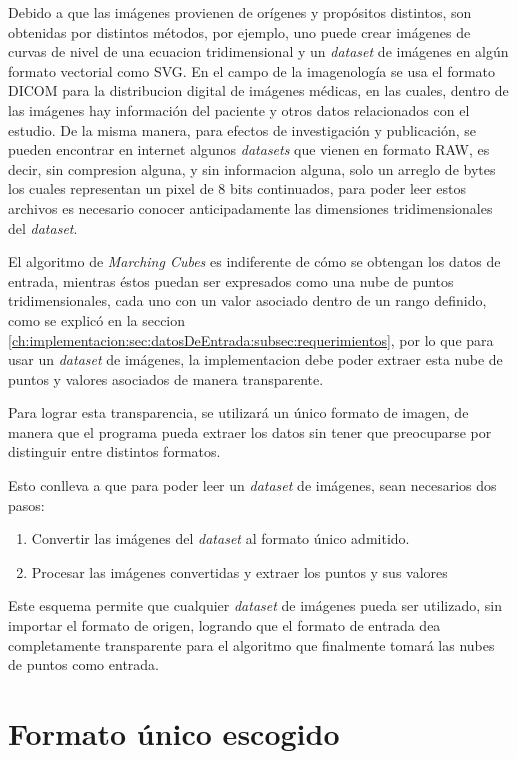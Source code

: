 Debido a que las imágenes provienen de orígenes y propósitos distintos, son obtenidas por distintos métodos, por ejemplo, uno puede crear imágenes de curvas de nivel de una ecuacion tridimensional y un \emph{dataset} de imágenes en algún formato vectorial como SVG. En el campo de la imagenología se usa el formato DICOM para la distribucion digital de imágenes médicas, en las cuales, dentro de las imágenes hay información del paciente y otros datos relacionados con el estudio. De la misma manera, para efectos de investigación y publicación, se pueden encontrar en internet algunos \emph{datasets} que vienen en formato RAW, es decir, sin compresion alguna, y sin informacion alguna, solo un arreglo de bytes los cuales representan un pixel de 8 bits continuados, para poder leer estos archivos es necesario conocer anticipadamente las dimensiones tridimensionales del \emph{dataset}.

El algoritmo de \emph{Marching Cubes} es indiferente de cómo se obtengan los datos de entrada, mientras éstos puedan ser expresados como una nube de puntos tridimensionales, cada uno con un valor asociado dentro de un rango definido, como se explicó en la seccion \ref{ch:implementacion:sec:datosDeEntrada:subsec:requerimientos}, por lo que para usar un \emph{dataset} de imágenes, la implementacion debe poder extraer esta nube de puntos y valores asociados de manera transparente.

Para lograr esta transparencia, se utilizará un único formato de imagen, de manera que el programa pueda extraer los datos sin tener que preocuparse por distinguir entre distintos formatos.

Esto conlleva a que para poder leer un \emph{dataset} de imágenes, sean necesarios dos pasos:

\begin{enumerate}
	\item Convertir las imágenes del \emph{dataset} al formato único admitido.
	\item Procesar las imágenes convertidas y extraer los puntos y sus valores
\end{enumerate}

Este esquema permite que cualquier \emph{dataset} de imágenes pueda ser utilizado, sin importar el formato de origen, logrando que el formato de entrada dea completamente transparente para el algoritmo que finalmente tomará las nubes de puntos como entrada.

\section{Formato único escogido}
\label{ch:implementacion:sec:formatounicoescogido}

